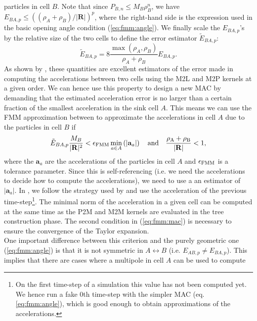 particles in cell $B$. Note that since $P_{B,n} \leq M_B
\rho_B^n$, we have $E_{BA, p} \leq \left((\rho_A +
\rho_B)/|\mathbf{R}|\right)^p$, where the right-hand side is the
expression used in the basic opening angle condition
(\ref{eq:fmm:angle}). We finally scale the $E_{BA,p}$'s by the relative
size of the two cells to define the error estimator $\tilde{E}_{BA,p}$:
\begin{equation}
  \tilde{E}_{BA,p} = 8\frac{\max(\rho_A, \rho_B)}{\rho_A + \rho_B}E_{BA,p}.
  \label{eq:fmm:e_ab_tilde}
\end{equation}
As shown by \cite{Dehnen2014}, these quantities are excellent estimators of
the error made in computing the accelerations between two cells using the
M2L and M2P kernels at a given order. We can hence use this property to
design a new MAC by demanding that the estimated acceleration error is no
larger than a certain fraction of the smallest acceleration in the sink
cell $A$. This means we can use the FMM approximation between to
approximate the accelerations in cell $A$ due to the particles in cell $B$ if
\begin{equation}
  \tilde{E}_{BA,p} \frac{M_B}{|\mathbf{R}|^2} < \epsilon_{\rm FMM} \min_{a\in
    A}\left(|\mathbf{a}_a|\right) \quad \rm{and} \quad \frac{\rho_A +
    \rho_B} {|\mathbf{R}|} < 1,
  \label{eq:fmm:mac}  
\end{equation}
where the $\mathbf{a}_a$ are the accelerations of the particles in cell $A$
and $\epsilon_{\rm FMM}$ is a tolerance parameter. Since this is self-referencing
(i.e. we need the accelerations to decide how to compute the
accelerations), we need to use a an estimator of $|\mathbf{a}_a|$. In
\swift, we follow the strategy used by \gadget and use the acceleration of
the previous time-step\footnote{On the first time-step of a simulation this
  value has not been computed yet. We hence run a fake 0th time-step with
  the simpler MAC (eq. \ref{eq:fmm:angle}), which is good enough to obtain
  approximations of the accelerations.}. The minimal norm of the
acceleration in a given cell can be computed at the same time as the P2M
and M2M kernels are evaluated in the tree construction phase. The second
condition in (\ref{eq:fmm:mac}) is necessary to ensure the convergence of the
Taylor expansion.\\
One important difference between this criterion and the purely
geometric one (\ref{eq:fmm:angle}) is that it is not symmetric in $A
\leftrightarrow B$ (i.e. $E_{AB,p} \neq E_{BA,p}$). This implies that
there are cases where a multipole in cell $A$ can be used to compute
